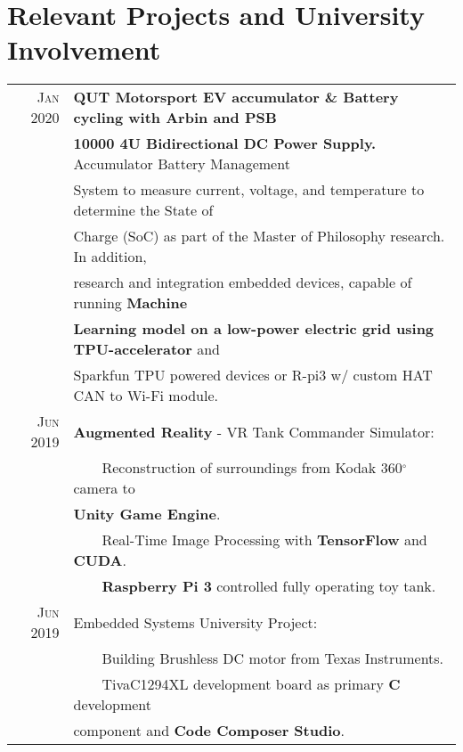 \documentclass[a4paper,12pt]{article}
\newcommand{\tabitem}{~~\llap{\textbullet}~~}
\begin{document}
\section{Relevant Projects and University Involvement}
	\begin{tabular}{rl}
	    \textsc{Jan} 2020 & \textbf{QUT Motorsport EV accumulator \& Battery cycling with Arbin and PSB} \\
	    & \textbf{10000 4U Bidirectional DC Power Supply.} Accumulator Battery Management \\
	    & System to measure current, voltage, and temperature to determine the State of \\
	    & Charge (SoC) as part of the Master of Philosophy research. In addition, \\
	    & research and integration embedded devices, capable of running \textbf{Machine} \\
	    & \textbf{Learning model on a low-power electric grid using TPU-accelerator} and \\
	    & Sparkfun TPU powered devices or R-pi3 w/ custom HAT CAN to Wi-Fi module. \\
	    \textsc{Jun} 2019 & \textbf{Augmented Reality} - VR Tank Commander Simulator: \\
	        & \tabitem Reconstruction of surroundings from Kodak 360$^{\circ}$ camera to \\
	        & \textbf{Unity Game Engine}. \\ %
	        & \tabitem Real-Time Image Processing with \textbf{TensorFlow} and \textbf{CUDA}. \\
	        & \tabitem \textbf{Raspberry Pi 3} controlled fully operating toy tank. \\ [1pc]
	        
        \textsc{Jun} 2019 & Embedded Systems University Project: \\
            & \tabitem Building Brushless DC motor from Texas Instruments. \\
            & \tabitem TivaC1294XL development board as primary \textbf{C} development \\
            & component and \textbf{Code Composer Studio}. \\ [1pc]
            

\end{tabular}
\end{document}
